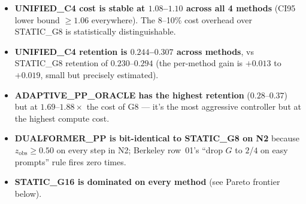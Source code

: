 \begin{itemize}
\item \textbf{UNIFIED\_C4 cost is stable at $1.08$--$1.10$ across all 4 methods}
      (CI95 lower bound $\geq 1.06$ everywhere). The 8--10\% cost overhead
      over STATIC\_G8 is statistically distinguishable.
\item \textbf{UNIFIED\_C4 retention is $0.244$--$0.307$ across methods}, vs
      STATIC\_G8 retention of $0.230$--$0.294$ (the per-method gain is
      $+0.013$ to $+0.019$, small but precisely estimated).
\item \textbf{ADAPTIVE\_PP\_ORACLE has the highest retention} ($0.28$--$0.37$)
      but at $1.69$--$1.88\times$ the cost of G8 --- it's the most aggressive
      controller but at the highest compute cost.
\item \textbf{DUALFORMER\_PP is bit-identical to STATIC\_G8 on N2} because
      $z_{\mathrm{obs}} \geq 0.50$ on every step in N2; Berkeley row~01's
      ``drop $G$ to $2$/$4$ on easy prompts'' rule fires zero times.
\item \textbf{STATIC\_G16 is dominated on every method} (see Pareto frontier
      below).
\end{itemize}

